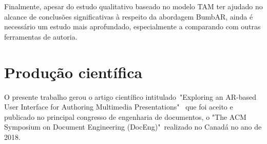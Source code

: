 \documentclass[../main.tex]{subfiles}
\begin{document}
Finalmente, apesar do estudo qualitativo baseado no modelo TAM ter ajudado no alcance de conclusões significativas à respeito da abordagem BumbAR, ainda é necessário um estudo mais aprofundado, especialmente a comparando com outras ferramentas de autoria.

\section{Produção científica}

O presente trabalho gerou o artigo científico intitulado~"Exploring an AR-based User Interface for Authoring Multimedia Presentations"~\cite{mendes2018exploring} que foi aceito e publicado no principal congresso de engenharia de documentos, o "The ACM Symposium on Document Engineering (DocEng)"~realizado no Canadá no ano de 2018. 
\end{document}
